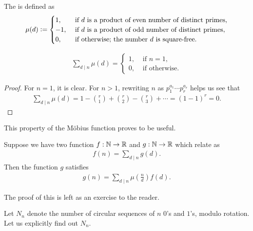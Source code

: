 The  is defined as
\begin{equation}
    \mu(d) \vcentcolon= \begin{cases}
        1, &\text{ if } d \text{ is a product of even number of distinct primes},\\
        -1, &\text{ if } d \text{ is a product of odd number of distinct primes},\\
        0, &\text{ if otherwise; the number } d \text{ is square-free.}
    \end{cases}
\end{equation}

\begin{theorem}
    \begin{align}
        \sum_{d \mid n} \mu(d) = \begin{cases}
            1, &\text{ if } n = 1,\\
            0, &\text{ if otherwise.}
        \end{cases}
    \end{align}
\end{theorem}

\begin{proof}
    For $n = 1$, it is clear. For $n > 1$, rewriting $n$ as $p_{1}^{a_{1}} \cdots p_{r}^{a_{r}}$ helps us see that
    \begin{align}
        \sum_{d \mid n} \mu(d) = 1 - \binom{r}{1} + \binom{r}{2} - \binom{r}{3} + \cdots = (1-1)^{r} = 0.
    \end{align}
\end{proof}

This property of the M\"obius function proves to be useful.

\begin{theorem}
    Suppose we have two function $f: \mathbb{N} \to \mathbb{R}$ and $g:\mathbb{N} \to \mathbb{R}$ which relate as
    \begin{align}
        f(n) = \sum_{d \mid n} g(d).
    \end{align}
    Then the function $g$ satisfies
    \begin{align}
        g(n) = \sum_{d \mid n} \mu\left( \frac{n}{d} \right)f(d).
    \end{align}
\end{theorem}
The proof of this is left as an exercise to the reader.

\begin{example}
    Let $N_{n}$ denote the number of circular sequences of $n$ $0$'s and $1$'s, modulo rotation. Let us explicitly find out $N_{n}$.
\end{example}